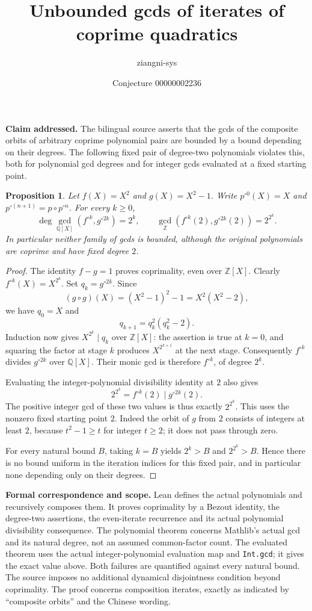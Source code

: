 \documentclass[11pt]{article}
\title{Unbounded gcds of iterates of coprime quadratics}
\author{ziangni-sys}
\date{Conjecture 00000002236}
\newtheorem{proposition}{Proposition}
\begin{document}
\maketitle
\noindent\textbf{Claim addressed.} The bilingual source asserts that the gcds of the composite orbits of arbitrary coprime polynomial pairs are bounded by a bound depending on their degrees. The following fixed pair of degree-two polynomials violates this, both for polynomial gcd degrees and for integer gcds evaluated at a fixed starting point.

\begin{proposition}
Let $f(X)=X^2$ and $g(X)=X^2-1$. Write $p^{\circ0}(X)=X$ and $p^{\circ(n+1)}=p\circ p^{\circ n}$. For every $k\geq0$,
\[
 \deg\gcd_{\mathbb Q[X]}(f^{\circ k},g^{\circ2k})=2^k, \qquad
 \gcd_{\mathbb Z}(f^{\circ k}(2),g^{\circ2k}(2))=2^{2^k}.
\]
In particular neither family of gcds is bounded, although the original polynomials are coprime and have fixed degree $2$.
\end{proposition}
\begin{proof}
The identity $f-g=1$ proves coprimality, even over $\mathbb Z[X]$. Clearly $f^{\circ k}(X)=X^{2^k}$. Set $q_k=g^{\circ2k}$. Since
\[
 (g\circ g)(X)=(X^2-1)^2-1=X^2(X^2-2),
\]
we have $q_0=X$ and
\[
 q_{k+1}=q_k^2(q_k^2-2).
\]
Induction now gives $X^{2^k}\mid q_k$ over $\mathbb Z[X]$: the assertion is true at $k=0$, and squaring the factor at stage $k$ produces $X^{2^{k+1}}$ at the next stage. Consequently $f^{\circ k}$ divides $g^{\circ2k}$ over $\mathbb Q[X]$. Their monic gcd is therefore $f^{\circ k}$, of degree $2^k$.

Evaluating the integer-polynomial divisibility identity at $2$ also gives
\[
 2^{2^k}=f^{\circ k}(2)\mid g^{\circ2k}(2).
\]
The positive integer gcd of these two values is thus exactly $2^{2^k}$. This uses the nonzero fixed starting point $2$. Indeed the orbit of $g$ from $2$ consists of integers at least $2$, because $t^2-1\geq t$ for integer $t\geq2$; it does not pass through zero.

For every natural bound $B$, taking $k=B$ yields $2^k>B$ and $2^{2^k}>B$. Hence there is no bound uniform in the iteration indices for this fixed pair, and in particular none depending only on their degrees.
\end{proof}

\noindent\textbf{Formal correspondence and scope.} Lean defines the actual polynomials and recursively composes them. It proves coprimality by a Bezout identity, the degree-two assertions, the even-iterate recurrence and its actual polynomial divisibility consequence. The polynomial theorem concerns Mathlib's actual gcd and its natural degree, not an assumed common-factor count. The evaluated theorem uses the actual integer-polynomial evaluation map and \texttt{Int.gcd}; it gives the exact value above. Both failures are quantified against every natural bound. The source imposes no additional dynamical disjointness condition beyond coprimality. The proof concerns composition iterates, exactly as indicated by ``composite orbits'' and the Chinese wording.
\end{document}
